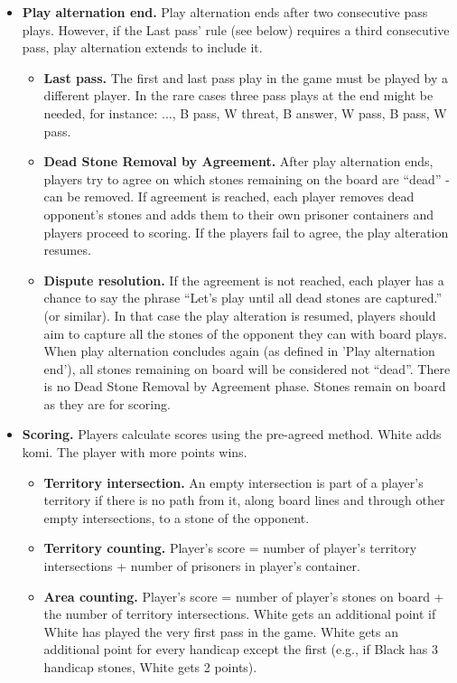 \documentclass[11pt]{article}
\begin{document}
\begin{itemize}
\item \textbf{Play alternation end.} Play alternation ends after two consecutive pass plays.
However, if the Last pass' rule (see below) requires a third consecutive pass, play alternation extends to include it.
    \begin{itemize}
    \item \textbf{Last pass.} The first and last pass play in the game must be played by a different player.
    In the rare cases three pass plays at the end might be needed, for instance: ..., B pass, W threat, B answer, W pass, B pass, W pass.
    \item \textbf{Dead Stone Removal by Agreement.} After play alternation ends, players try to agree on which stones remaining on the board are ``dead'' - can be removed.
    If agreement is reached, each player removes dead opponent's stones and adds them to their own prisoner containers and players proceed to scoring.
    If the players fail to agree, the play alteration resumes.
    \item \textbf{Dispute resolution.} If the agreement is not reached, each player has a chance to say the phrase ``Let's play until all dead stones are captured.'' (or similar).
    In that case the play alteration is resumed, players should aim to capture all the stones of the opponent they can with board plays.
    When play alternation concludes again (as defined in 'Play alternation end'), all stones remaining on board will be considered not ``dead''.
    There is no Dead Stone Removal by Agreement phase.
    Stones remain on board as they are for scoring.
    \end{itemize}

\item \textbf{Scoring.} Players calculate scores using the pre-agreed method.
White adds komi.
The player with more points wins.
    \begin{itemize}
    \item \textbf{Territory intersection.} An empty intersection is part of a player's territory if there is no path from it, along board lines and through other empty intersections, to a stone of the opponent.
    \item \textbf{Territory counting.} Player's score = number of player's territory intersections + number of prisoners in player's container.
    \item \textbf{Area counting.} Player's score = number of player's stones on board + the number of territory intersections.
    White gets an additional point if White has played the very first pass in the game.
    White gets an additional point for every handicap except the first (e.g., if Black has 3 handicap stones, White gets 2 points).
    \end{itemize}
\end{itemize}
\end{document}
